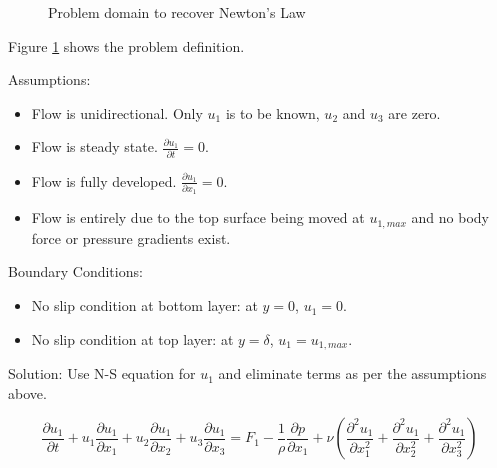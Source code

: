 \begin{figure}[h]
\begin{center}
\end{center}
\caption{Problem domain to recover Newton's Law}
\label{nlawfig}
\end{figure}

Figure \ref{nlawfig} shows the problem definition.


Assumptions:
\begin{itemize}
\item Flow is unidirectional. Only $u_1$ is to be known, $u_2$ and $u_3$ are zero.
\item Flow is steady state. $\frac{\partial u_1}{\partial t} = 0$.
\item Flow is fully developed. $\frac{\partial u_1}{\partial x_1} = 0$.
\item Flow is entirely due to the top surface being moved at $u_{1,max}$ and no body force or pressure gradients exist.
\end{itemize}


Boundary Conditions:
\begin{itemize}
\item No slip condition at bottom layer: at $y=0$, $u_1=0$.
\item No slip condition at top layer: at $y=\delta$, $u_1=u_{1,max}$.
\end{itemize}


Solution:
Use N-S equation for $u_1$ and eliminate terms as per the assumptions above.

\begin{equation}
\frac{\partial u_1}{\partial t} + u_1\frac{\partial u_1}{\partial x_1} + u_2\frac{\partial u_1}{\partial x_2} + u_3\frac{\partial u_1}{\partial x_3} = F_1 -  \frac{1}{\rho}\frac{\partial p}{\partial x_1} + \nu \left( \frac{\partial^2 u_1}{\partial x_1^2} + \frac{\partial^2 u_1}{\partial x_2^2} + \frac{\partial^2 u_1}{\partial x_3^2} \right)
\end{equation} 

